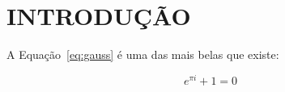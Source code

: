\section*{INTRODUÇÃO}

\lipsum[2]

A Equação~\eqref{eq:gauss} é uma das mais belas que existe:

\begin{equation}\label{eq:gauss}
  e^{\pi i} + 1 = 0
\end{equation}

\lipsum[1-4]

